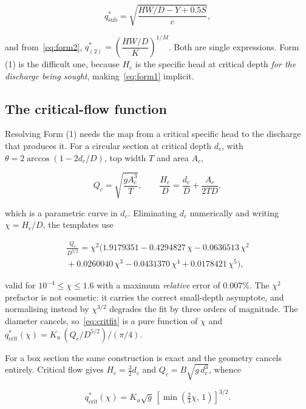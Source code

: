 \documentclass[11pt,a4paper]{article}
\begin{document}
\begin{equation}
q^{*}_{\mathrm{sub}}=\sqrt{\frac{HW/D-Y+0.5S}{c}},
\label{eq:invsub}
\end{equation}

\noindent
and from~\eqref{eq:form2},
$q^{*}_{(2)}=\left(\dfrac{HW/D}{K}\right)^{1/M}$. Both are single expressions.
Form (1) is the difficult one, because $H_c$ is the specific head at critical
depth \emph{for the discharge being sought}, making~\eqref{eq:form1} implicit.

\subsection{The critical-flow function}

Resolving Form (1) needs the map from a critical specific head to the discharge
that produces it. For a circular section at critical depth $d_c$, with
$\theta=2\arccos(1-2d_c/D)$, top width $T$ and area $A_c$,

\begin{equation}
Q_c=\sqrt{\frac{g A_c^{3}}{T}},\qquad
\frac{H_c}{D}=\frac{d_c}{D}+\frac{A_c}{2TD},
\label{eq:crit}
\end{equation}

\noindent
which is a parametric curve in $d_c$. Eliminating $d_c$ numerically and writing
$\chi=H_c/D$, the templates use

\begin{multline}
\frac{Q_c}{D^{5/2}}=\chi^{2}\bigl(1.9179351-0.4294827\,\chi-0.0636513\,\chi^{2}\\
   {}+0.0260040\,\chi^{3}-0.0431370\,\chi^{4}+0.0178421\,\chi^{5}\bigr),
\label{eq:critfit}
\end{multline}

\noindent
valid for $10^{-4}\le\chi\le1.6$ with a maximum \emph{relative} error of
$0.007\%$. The $\chi^{2}$ prefactor is not cosmetic: it carries the correct
small-depth asymptote, and normalising instead by $\chi^{3/2}$ degrades the fit
by three orders of magnitude. The diameter cancels, so~\eqref{eq:critfit} is a
pure function of $\chi$ and
$q^{*}_{\mathrm{crit}}(\chi)=K_u\,(Q_c/D^{5/2})/(\pi/4)$.

For a box section the same construction is exact and the geometry cancels
entirely. Critical flow gives $H_c=\tfrac32 d_c$ and $Q_c=B\sqrt{g\,d_c^{3}}$,
whence

\begin{equation}
q^{*}_{\mathrm{crit}}(\chi)=K_u\sqrt{g}\,
  \left[\min\!\left(\tfrac23\chi,\,1\right)\right]^{3/2}.
\label{eq:critbox}
\end{equation}
\end{document}
